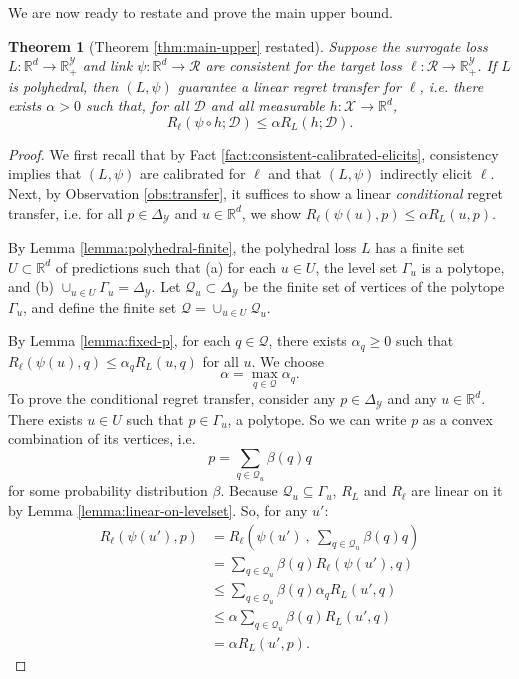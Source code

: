 \documentclass{article}
\newtheorem{theorem}{Theorem}
\theoremstyle{definition}\newtheorem{definition}{Definition}
\theoremstyle{definition}\newtheorem{assumption}{Assumption}
\newcommand{\reals}{\mathbb{R}}
\newcommand{\simplex}{\Delta_\Y}
\newcommand{\D}{\mathcal{D}}
\newcommand{\R}{\mathcal{R}}
\newcommand{\X}{\mathcal{X}}
\newcommand{\Y}{\mathcal{Y}}
\begin{document}
We are now ready to restate and prove the main upper bound.
\begin{theorem}[Theorem \ref{thm:main-upper} restated]
  Suppose the surrogate loss $L: \reals^d \to \reals_+^{\Y}$ and link $\psi: \reals^d \to \R$ are consistent for the target loss $\ell: \R \to \reals_+^{\Y}$.
  If $L$ is polyhedral, then $(L,\psi)$ guarantee a linear regret transfer for $\ell$, i.e. there exists $\alpha > 0$ such that, for all $\D$ and all measurable $h: \X \to \reals^d$,
    \[ R_{\ell}(\psi \circ h ; \D) \leq \alpha R_L(h ; \D) . \]
\end{theorem}
\begin{proof}
  We first recall that by Fact \ref{fact:consistent-calibrated-elicits}, consistency implies that $(L,\psi)$ are calibrated for $\ell$ and that $(L,\psi)$ indirectly elicit $\ell$.
  Next, by Observation \ref{obs:transfer}, it suffices to show a linear \emph{conditional} regret transfer, i.e. for all $p \in \simplex$ and $u \in \reals^d$, we show $R_{\ell}(\psi(u),p) \leq \alpha R_L(u,p)$.
  
  By Lemma \ref{lemma:polyhedral-finite}, the polyhedral loss $L$ has a finite set $U \subset \reals^d$ of predictions such that (a) for each $u \in U$, the level set $\Gamma_u$ is a polytope, and (b) $\cup_{u \in U} \Gamma_u = \simplex$.
  Let $\mathcal{Q}_u \subset \simplex$ be the finite set of vertices of the polytope $\Gamma_u$, and define the finite set $\mathcal{Q} = \cup_{u \in U} \mathcal{Q}_u$.
  
  By Lemma \ref{lemma:fixed-p}, for each $q \in \mathcal{Q}$, there exists $\alpha_q \geq 0$ such that $R_{\ell}(\psi(u),q) \leq \alpha_q R_L(u,q)$ for all $u$.
  We choose
    \[ \alpha = \max_{q \in \mathcal{Q}} \alpha_q . \]
  To prove the conditional regret transfer, consider any $p \in \simplex$ and any $u \in \reals^d$.
  There exists $u \in U$ such that $p \in \Gamma_u$, a polytope.
  So we can write $p$ as a convex combination of its vertices, i.e.
    \[ p = \sum_{q \in \mathcal{Q}_u} \beta(q) q \]
  for some probability distribution $\beta$.
  Because $\mathcal{Q}_u \subseteq \Gamma_u$, $R_L$ and $R_{\ell}$ are linear on it by Lemma \ref{lemma:linear-on-levelset}.
  So, for any $u'$:
  \begin{align*}
    R_{\ell}(\psi(u'),p)
    &=    R_{\ell}\left(\psi(u') ~,~ \sum_{q \in \mathcal{Q}_u} \beta(q) q\right)  \\
    &=    \sum_{q \in \mathcal{Q}_u} \beta(q) R_{\ell}(\psi(u'),q)  \\
    &\leq \sum_{q \in \mathcal{Q}_u} \beta(q) \alpha_{q} R_L(u',q)  \\
    &\leq \alpha \sum_{q \in \mathcal{Q}_u} \beta(q) R_L(u',q)  \\
    &=    \alpha R_L(u', p) .
  \end{align*}
\end{proof}
\end{document}
